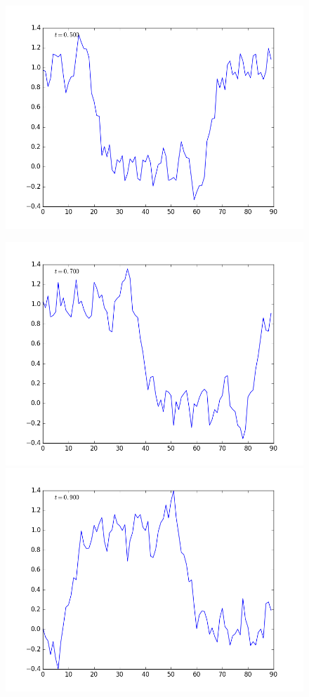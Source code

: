 \documentclass[12pt]{article}
\begin{document}
\begin{enumerate}[(a)]
\begin{figure}[H]
\includegraphics[scale=0.45]{CN_advection_frames/CN_advection_fig07.png}
\end{figure} 
\begin{figure}[H]
\includegraphics[scale=0.45]{CN_advection_frames/CN_advection_fig09.png}
\includegraphics[scale=0.45]{CN_advection_frames/CN_advection_fig11.png}

\end{figure}
\end{enumerate}
\end{document}
